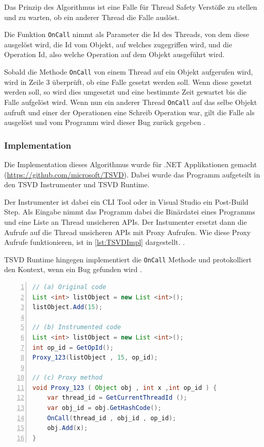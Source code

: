 Das Prinzip des Algorithmus ist eine Falle für Thread Safety Verstöße zu stellen und zu warten, ob ein anderer Thread die Falle auslöst. 

Die Funktion \texttt{OnCall} nimmt als Parameter die Id des Threads, von dem diese ausgelöst wird, die Id vom Objekt, auf welches zugegriffen wird, und die Operation Id, also welche Operation auf dem Objekt ausgeführt wird.

Sobald die Methode \texttt{OnCall} von einem Thread auf ein Objekt aufgerufen wird, wird in Zeile 3 überprüft, ob eine Falle gesetzt werden soll. Wenn diese gesetzt werden soll, so wird dies umgesetzt und eine bestimmte Zeit gewartet bis die Falle aufgelöst wird. Wenn nun ein anderer Thread \texttt{OnCall} auf das selbe Objekt aufruft und einer der Operationen eine Schreib Operation war, gilt die Falle als ausgelöst und vom Programm wird dieser Bug zurück gegeben \cite[vgl.][166]{li_efficient_2019}.

\subsubsection*{Implementation}

Die Implementation dieses Algorithmus wurde für .NET Applikationen gemacht (\url{https://github.com/microsoft/TSVD}). Dabei wurde das Programm aufgeteilt in den \acs{TSVD} Instrumenter und \acs{TSVD} Runtime.  

Der Instrumenter ist dabei ein \ac{CLI} Tool oder in Visual Studio ein Post-Build Step. Als Eingabe nimmt das Programm dabei die Binärdatei eines Programms und eine Liste an Thread unsicheren \ac{API}s. Der Instumenter ersetzt dann die Aufrufe auf die Thread unsicheren \acs{API}s mit Proxy Aufrufen. Wie diese Proxy Aufrufe funktionieren, ist in \ref{lst:TSVDImpl} dargestellt. \cite[vgl.][170]{li_efficient_2019}.

\acs{TSVD} Runtime hingegen implementiert die \texttt{OnCall} Methode und protokolliert den Kontext, wenn ein Bug gefunden wird \cite[vgl.][170-171]{li_efficient_2019}.
\\
\begin{lstlisting}[language=Java,frame=tb,caption={\acs{TSVD} Proxy Aufrufe}, label={lst:TSVDImpl}, numbers=left, stepnumber=1, captionpos=b]
// (a) Original code
List <int> listObject = new List <int>();
listObject.Add(15); 
      
// (b) Instrumented code 
List <int> listObject = new List <int>(); 
int op_id = GetOpId(); 
Proxy_123(listObject , 15, op_id); 
     
// (c) Proxy method
void Proxy_123 ( Object obj , int x ,int op_id ) { 
    var thread_id = GetCurrentThreadId (); 
    var obj_id = obj.GetHashCode(); 
    OnCall(thread_id , obj_id , op_id); 
    obj.Add(x);
}
\end{lstlisting}

